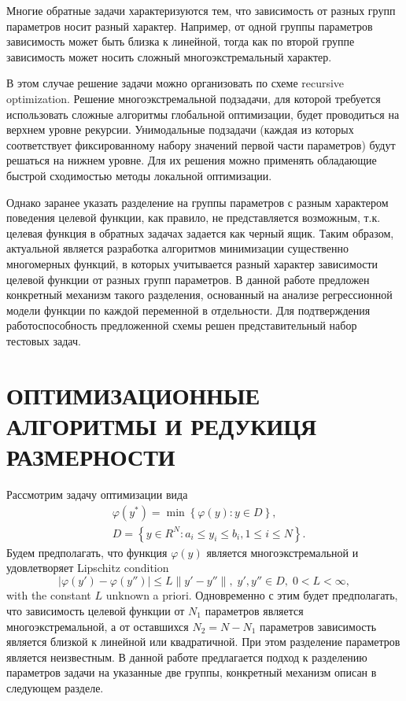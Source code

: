 \documentclass{aip-cp}
\begin{document}
Многие обратные задачи характеризуются тем, что зависимость от разных групп параметров носит разный характер. Например, от одной группы параметров зависимость может быть близка к линейной, тогда как по второй группе зависимость может носить сложный многоэкстремальный характер.

В этом случае решение задачи можно организовать по схеме recursive optimization. Решение  многоэкстремальной подзадачи, для которой требуется использовать сложные алгоритмы глобальной оптимизации, будет проводиться на верхнем уровне рекурсии.
Унимодальные подзадачи (каждая из которых соответствует фиксированному набору значений первой части параметров) будут решаться на нижнем уровне. Для их решения можно применять обладающие быстрой сходимостью методы локальной оптимизации.

Однако заранее указать разделение на группы параметров с разным характером поведения целевой функции, как правило, не представляется возможным, т.к. целевая функция в обратных задачах задается как черный ящик. 
Таким образом, актуальной является разработка алгоритмов минимизации существенно многомерных функций, в которых учитывается разный характер зависимости целевой функции от разных групп параметров. 
В данной работе предложен конкретный механизм такого разделения, основанный на анализе регрессионной модели функции по каждой переменной в отдельности.
Для подтверждения работоспособность предложенной схемы решен представительный набор тестовых задач.

\section{ОПТИМИЗАЦИОННЫЕ АЛГОРИТМЫ И РЕДУКИЦЯ РАЗМЕРНОСТИ}

Рассмотрим задачу оптимизации вида
\begin{eqnarray}\label{main_problem}
& \varphi(y^\ast)=\min{\left\{\varphi(y): y\in D\right\}}, \nonumber \\
& D=\left\{y\in R^N: a_i\leq y_i \leq b_i, 1\leq i \leq N\right\}. \nonumber
\end{eqnarray}
Будем предполагать, что функция $\varphi(y)$ является многоэкстремальной и удовлетворяет Lipschitz condition
\[
\left|\varphi(y')-\varphi(y'')\right|\leq L\left\|y'-y''\right\|,\; y',y'' \in D,\; 0<L<\infty,
\]
with the constant $L$ unknown a priori.
Одновременно с этим будет предполагать, что зависимость целевой функции от $N_1$ параметров является многоэкстремальной, а от оставшихся $N_2 = N - N_1$ параметров зависимость является близкой к линейной или квадратичной. При этом разделение  параметров является неизвестным. В данной работе предлагается подход к разделению параметров задачи на указанные две группы, конкретный механизм описан в следующем разделе. 
\end{document}
